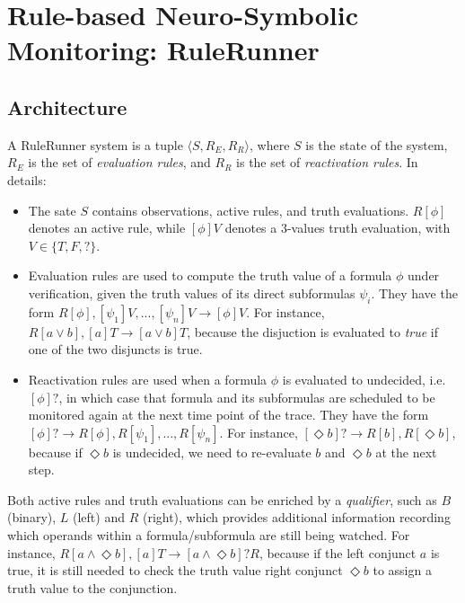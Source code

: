 \section{Rule-based Neuro-Symbolic Monitoring: RuleRunner}
\label{sec:rulerunner}

\subsection{Architecture}
\label{sec:rulerunner-arch}

A RuleRunner system is a tuple $\langle S,R_E,R_R \rangle$, where $S$ is the state of the system, $R_E$ is the set of \emph{evaluation rules}, and $R_R$ is the set of \emph{reactivation rules}. In details:

\begin{itemize}
    \item The sate $S$ contains observations, active rules, and truth evaluations. $R[\phi]$ denotes an active rule, while $[\phi]V$  denotes a 3-values truth evaluation, with $V \in \{T, F, ?\}$.
    \item Evaluation rules are used to compute the truth value of a formula $\phi$ under verification, given the truth values of its direct subformulas $\psi_i$. They have the form $R[\phi],[\psi_1]V,...,[\psi_n]V \rightarrow [\phi]V$. For instance, $R[a \lor b], [a]T \rightarrow [a \lor b]T$, because the disjuction is evaluated to \emph{true} if one of the two disjuncts is true.
    \item Reactivation rules are used when a formula $\phi$ is evaluated to undecided, i.e. $[\phi]?$, in which case that formula and its subformulas are scheduled to be monitored again at the next time point of the trace. They have the form $[\phi]? \rightarrow R[\phi],R[\psi_1],...,R[\psi_n]$. For instance, $[\Diamond b]? \rightarrow R[b],R[\Diamond b]$, because if $\Diamond b$ is undecided, we need to re-evaluate $b$ and $\Diamond b$ at the next step.
\end{itemize}


\noindent
Both active rules and truth evaluations can be enriched by a \emph{qualifier}, such as $B$ (binary), $L$ (left) and $R$ (right), which provides additional information recording which operands within a formula/subformula are still being watched. For instance, $R[a \land \Diamond b], [a]T \rightarrow [a \land \Diamond b] ? R$, because if the left conjunct $a$ is true, it is still needed to check the truth value right conjunct $\Diamond b$ to assign a truth value to the conjunction.

